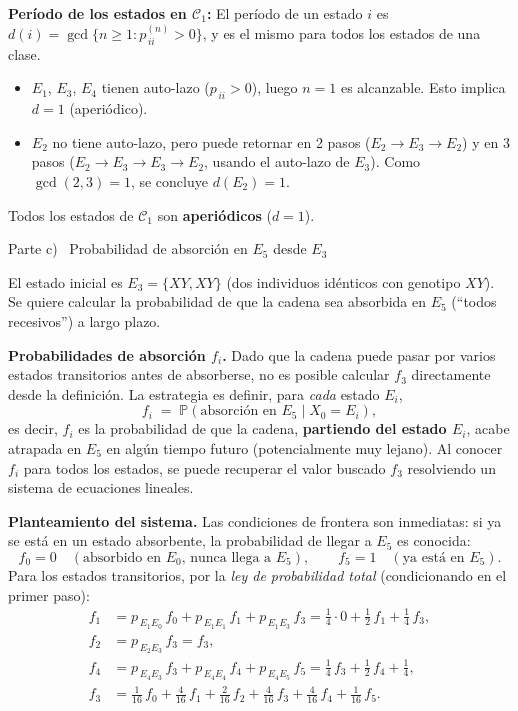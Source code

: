 \documentclass[10pt,a4paper]{article}
\newcommand{\Prob}[1]{\mathbb{P}\!\left(#1\right)}
\newcommand{\pij}[2]{p_{\,#1#2}}
\newcommand{\parteheader}[1]{%
  \vspace{8pt}\needspace{4cm}\noindent
  \begin{tcolorbox}[
    colback=subsecbg!18, colframe=subsecbg!55,
    sharp corners, boxrule=0.4pt,
    left=6pt, right=6pt, top=3pt, bottom=3pt,
    fontupper=\small\bfseries\sffamily,
  ]
  #1
  \end{tcolorbox}\vspace{2pt}%
}
\begin{document}
\medskip
\textbf{Per\'iodo de los estados en $\mathcal{C}_1$:}\quad
El per\'iodo de un estado $i$ es $d(i)=\gcd\{n\ge 1: \pij{i}{i}^{(n)}>0\}$,
y es el mismo para todos los estados de una clase.

\begin{itemize}
  \item $E_1$, $E_3$, $E_4$ tienen auto-lazo ($\pij{i}{i}>0$), luego $n=1$ es
        alcanzable. Esto implica $d=1$ (aperiódico).
  \item $E_2$ no tiene auto-lazo, pero puede retornar en 2 pasos
        ($E_2\to E_3\to E_2$) y en 3 pasos ($E_2\to E_3\to E_3\to E_2$, usando
        el auto-lazo de $E_3$). Como $\gcd(2,3)=1$, se concluye $d(E_2)=1$.
\end{itemize}

Todos los estados de $\mathcal{C}_1$ son \textbf{aperiódicos} ($d=1$).

\parteheader{Parte c) \textperiodcentered\ Probabilidad de absorci\'on en $E_5$ desde $E_3$}

El estado inicial es $E_3 = \{XY,XY\}$ (dos individuos id\'enticos con genotipo
$XY$). Se quiere calcular la probabilidad de que la cadena sea absorbida en $E_5$
(``todos recesivos'') a largo plazo.

\medskip
\textbf{Probabilidades de absorci\'on $f_i$.}\quad
Dado que la cadena puede pasar por varios estados transitorios antes de absorberse,
no es posible calcular $f_3$ directamente desde la definici\'on. La estrategia es
definir, para \emph{cada} estado $E_i$,
\[
  f_i \;=\; \Prob{\text{absorci\'on en }E_5 \mid X_0 = E_i},
\]
es decir, $f_i$ es la probabilidad de que la cadena, \textbf{partiendo del estado
  $E_i$}, acabe atrapada en $E_5$ en alg\'un tiempo futuro (potencialmente muy lejano).
Al conocer $f_i$ para todos los estados, se puede recuperar el valor buscado
$f_3$ resolviendo un sistema de ecuaciones lineales.

\medskip
\textbf{Planteamiento del sistema.}\quad
Las condiciones de frontera son inmediatas: si ya se est\'a en un estado
absorbente, la probabilidad de llegar a $E_5$ es conocida:
\[
  f_0 = 0 \quad (\text{absorbido en }E_0\text{, nunca llega a }E_5), \qquad
  f_5 = 1 \quad (\text{ya est\'a en }E_5).
\]
Para los estados transitorios, por la \emph{ley de probabilidad total} (condicionando
en el primer paso):
\begin{align}
  f_1 & = \pij{E_1}{E_0}\,f_0 + \pij{E_1}{E_1}\,f_1 + \pij{E_1}{E_3}\,f_3
  = \tfrac{1}{4}\cdot 0 + \tfrac{1}{2}\,f_1 + \tfrac{1}{4}\,f_3,          \\[4pt]
  f_2 & = \pij{E_2}{E_3}\,f_3 = f_3,                                      \\[4pt]
  f_4 & = \pij{E_4}{E_3}\,f_3 + \pij{E_4}{E_4}\,f_4 + \pij{E_4}{E_5}\,f_5
  = \tfrac{1}{4}\,f_3 + \tfrac{1}{2}\,f_4 + \tfrac{1}{4},                 \\[4pt]
  f_3 & = \tfrac{1}{16}\,f_0 + \tfrac{4}{16}\,f_1 + \tfrac{2}{16}\,f_2
  + \tfrac{4}{16}\,f_3 + \tfrac{4}{16}\,f_4 + \tfrac{1}{16}\,f_5.
\end{align}
\end{document}
